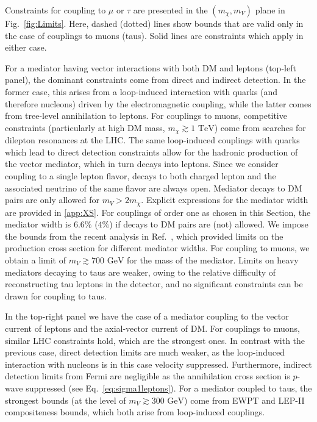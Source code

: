 \documentclass[final,5p,twocolumn]{elsarticle}
\newcommand{\Eq}[1]{Eq.~\eqref{#1}}
\newcommand{\Ref}[1]{Ref.~\cite{#1}}
\begin{document}
Constraints for coupling to $\mu$ or $\tau$ are presented in the $(m_\chi, m_V)$ plane in Fig.~\ref{fig:Limits}. Here, dashed (dotted) lines show bounds that are valid only in the case of couplings to muons (taus). Solid lines are constraints which apply in either case. 

For a mediator having vector interactions with both DM and leptons (top-left panel), the dominant constraints come from direct and indirect detection. In the former case, this arises from a loop-induced interaction with quarks (and therefore nucleons) driven by the electromagnetic coupling, while the latter comes from tree-level annihilation to leptons. For couplings to muons, competitive constraints (particularly at high DM mass, $m_\chi \gtrsim 1 \,\,\mathrm{TeV}$) come from searches for dilepton resonances at the LHC. The same loop-induced couplings with quarks which lead to direct detection constraints allow for the hadronic production of the vector mediator, which in turn decays into leptons. Since we consider coupling to a single lepton flavor, decays to both charged lepton and the associated neutrino of the same flavor are always open. Mediator decays to DM pairs are only allowed for $m_V > 2 m_\chi$. Explicit expressions for the mediator width are provided in \ref{app:XS}. For couplings of order one as chosen in this Section, the mediator width is $6.6 \%$ ($4 \%$) if decays to DM pairs are (not) allowed. We impose the bounds from the recent analysis in \Ref{ATLAS:2017wce}, which provided limits on the production cross section for different mediator widths.  For coupling to muons, we obtain a limit of $m_V \gtrsim 700 \,\,\mathrm{GeV}$ for the mass of the mediator. Limits on heavy mediators decaying to taus are weaker, owing to the relative difficulty of reconstructing tau leptons in the detector, and no significant constraints can be drawn for coupling to taus. 

In the top-right panel we have the case of a mediator coupling to the vector current of leptons and the axial-vector current of DM. For couplings to muons, similar LHC constraints hold, which are the strongest ones. In contrast with the previous case, direct detection limits are much weaker, as the loop-induced interaction with nucleons is in this case velocity suppressed. Furthermore, indirect detection limits from Fermi are negligible as the annihilation cross section is $p$-wave suppressed (see \Eq{eq:sigma1leptons}). For a mediator coupled to taus, the strongest bounds (at the level of $m_V \gtrsim 300 \,\,\mathrm{GeV}$) come from EWPT and LEP-II compositeness bounds, which both arise from loop-induced couplings.
 
\end{document}
